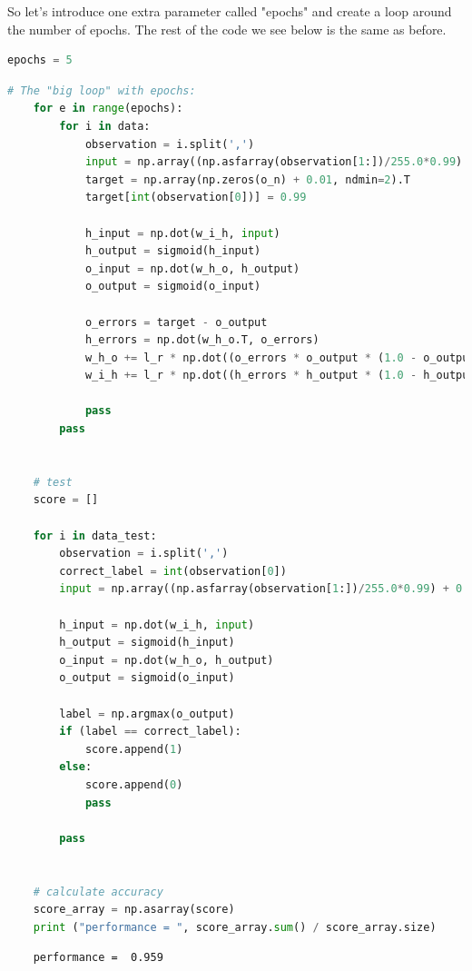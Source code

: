 So let's introduce one extra parameter called "epochs" and create a loop around the number of epochs. The rest of the code we see below is the same as before.
   
\begin{lstlisting}[language=Python]   
    epochs = 5
\end{lstlisting}

\begin{lstlisting}[language=Python]   
    # The "big loop" with epochs:
    for e in range(epochs):
        for i in data:
            observation = i.split(',')
            input = np.array((np.asfarray(observation[1:])/255.0*0.99) + 0.01, ndmin=2).T
            target = np.array(np.zeros(o_n) + 0.01, ndmin=2).T
            target[int(observation[0])] = 0.99
    
            h_input = np.dot(w_i_h, input)
            h_output = sigmoid(h_input)
            o_input = np.dot(w_h_o, h_output)
            o_output = sigmoid(o_input)
    
            o_errors = target - o_output
            h_errors = np.dot(w_h_o.T, o_errors)
            w_h_o += l_r * np.dot((o_errors * o_output * (1.0 - o_output)), np.transpose(h_output))
            w_i_h += l_r * np.dot((h_errors * h_output * (1.0 - h_output)), np.transpose(input))
    
            pass
        pass
    
    
    # test
    score = []
    
    for i in data_test:
        observation = i.split(',')
        correct_label = int(observation[0])
        input = np.array((np.asfarray(observation[1:])/255.0*0.99) + 0.01, ndmin=2).T
    
        h_input = np.dot(w_i_h, input)
        h_output = sigmoid(h_input)
        o_input = np.dot(w_h_o, h_output)
        o_output = sigmoid(o_input)
    
        label = np.argmax(o_output)
        if (label == correct_label):
            score.append(1)
        else:
            score.append(0)
            pass
        
        pass
    
    
    # calculate accuracy
    score_array = np.asarray(score)
    print ("performance = ", score_array.sum() / score_array.size)
\end{lstlisting}

\begin{lstlisting}
    performance =  0.959
\end{lstlisting}


